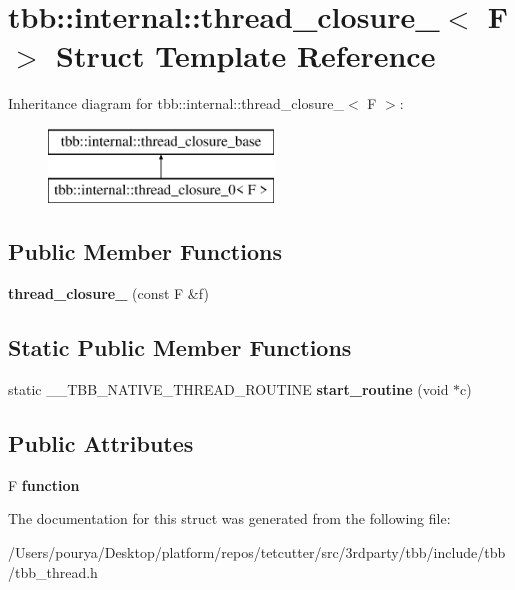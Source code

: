 \hypertarget{structtbb_1_1internal_1_1thread__closure__0}{}\section{tbb\+:\+:internal\+:\+:thread\+\_\+closure\+\_$<$ F $>$ Struct Template Reference}
\label{structtbb_1_1internal_1_1thread__closure__0}
Inheritance diagram for tbb\+:\+:internal\+:\+:thread\+\_\+closure\+\_$<$ F $>$\+:\begin{figure}[H]
\begin{center}
\leavevmode
\includegraphics[height=2.000000cm]{structtbb_1_1internal_1_1thread__closure__0}
\end{center}
\end{figure}
\subsection*{Public Member Functions}
\begin{DoxyCompactItemize}
\item 
\hypertarget{structtbb_1_1internal_1_1thread__closure__0_a538aa9db5b40cf64cdafc0af0649a7f2}{}{\bfseries thread\+\_\+closure\+\_} (const F \&f)\label{structtbb_1_1internal_1_1thread__closure__0_a538aa9db5b40cf64cdafc0af0649a7f2}

\end{DoxyCompactItemize}
\subsection*{Static Public Member Functions}
\begin{DoxyCompactItemize}
\item 
\hypertarget{structtbb_1_1internal_1_1thread__closure__0_a4b9e7370103f473212ccb10e65d676fb}{}static \+\_\+\+\_\+\+T\+B\+B\+\_\+\+N\+A\+T\+I\+V\+E\+\_\+\+T\+H\+R\+E\+A\+D\+\_\+\+R\+O\+U\+T\+I\+N\+E {\bfseries start\+\_\+routine} (void $\ast$c)\label{structtbb_1_1internal_1_1thread__closure__0_a4b9e7370103f473212ccb10e65d676fb}

\end{DoxyCompactItemize}
\subsection*{Public Attributes}
\begin{DoxyCompactItemize}
\item 
\hypertarget{structtbb_1_1internal_1_1thread__closure__0_aff55f3266cccfbb2d296aa9b07239ce8}{}F {\bfseries function}\label{structtbb_1_1internal_1_1thread__closure__0_aff55f3266cccfbb2d296aa9b07239ce8}

\end{DoxyCompactItemize}


The documentation for this struct was generated from the following file\+:\begin{DoxyCompactItemize}
\item 
/\+Users/pourya/\+Desktop/platform/repos/tetcutter/src/3rdparty/tbb/include/tbb/tbb\+\_\+thread.\+h\end{DoxyCompactItemize}
